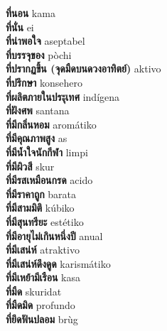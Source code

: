 \textbf{ ที่นอน  } kama \\
\textbf{ ที่นั่น  } ei \\
\textbf{ ที่น่าพอใจ  } aseptabel \\
\textbf{ ที่บรรจุของ  } pòchi \\
\textbf{ ที่ปรากฏขึ้น (จุดมืดบนดวงอาทิตย์)  } aktivo \\
\textbf{ ที่ปรึกษา  } konsehero \\
\textbf{ ที่ผลิตภายในประุเทศ  } indígena \\
\textbf{ ที่ฝังศพ  } santana \\
\textbf{ ที่มีกลิ่นหอม  } aromátiko \\
\textbf{ ที่มีคุณภาพสูง  } as \\
\textbf{ ที่มีน้ำใจนักกีฬา  } limpi \\
\textbf{ ที่มีผิวสี  } skur \\
\textbf{ ที่มีรสเหมือนกรด  } acido \\
\textbf{ ที่มีราคาถูก  } barata \\
\textbf{ ที่มีสามมิติ  } kúbiko \\
\textbf{ ที่มีสุนทรียะ  } estétiko \\
\textbf{ ที่มีอายุไม่เกินหนึ่งปี  } anual \\
\textbf{ ที่มีเสน่ห์  } atraktivo \\
\textbf{ ที่มีเสน่ห์ดึงดูด  } karismátiko \\
\textbf{ ที่มีเหย้ามีเรือน  } kasa \\
\textbf{ ที่มืด  } skuridat \\
\textbf{ ที่มืดมิด  } profundo \\
\textbf{ ที่ยึดฟันปลอม  } brùg \\
